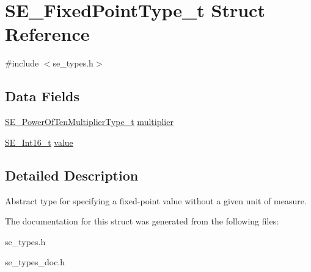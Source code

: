 \hypertarget{structSE__FixedPointType__t}{}\section{S\+E\+\_\+\+Fixed\+Point\+Type\+\_\+t Struct Reference}
\label{structSE__FixedPointType__t}


{\ttfamily \#include $<$se\+\_\+types.\+h$>$}

\subsection*{Data Fields}
\begin{DoxyCompactItemize}
\item 
\hyperlink{group__PowerOfTenMultiplierType_gaf0317b781dc8dbb9cb6ac4e44a14fdef}{S\+E\+\_\+\+Power\+Of\+Ten\+Multiplier\+Type\+\_\+t} \hyperlink{group__FixedPointType_ga96ce7caa60a292e7113993d3b20f3516}{multiplier}
\item 
\hyperlink{group__Int16_ga0d600c7df811a7d4b4816e8965877690}{S\+E\+\_\+\+Int16\+\_\+t} \hyperlink{group__FixedPointType_ga01947846b0d854d8942dacb03cf532cc}{value}
\end{DoxyCompactItemize}


\subsection{Detailed Description}
Abstract type for specifying a fixed-\/point value without a given unit of measure. 

The documentation for this struct was generated from the following files\+:\begin{DoxyCompactItemize}
\item 
se\+\_\+types.\+h\item 
se\+\_\+types\+\_\+doc.\+h\end{DoxyCompactItemize}
